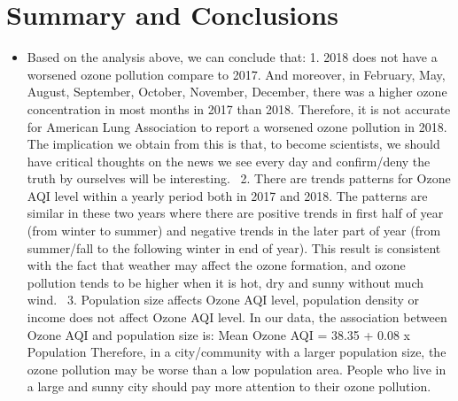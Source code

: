 \documentclass[12pt,]{article}
\begin{document}
\newpage

\section{Summary and Conclusions}\label{summary-and-conclusions}

\begin{itemize}
\item[]Based on the analysis above, we can conclude that: 
1.  2018 does not have a worsened ozone pollution compare to 2017. And moreover, in February, May, August, September, October, November, December, there was a higher ozone concentration in most months in 2017 than 2018. Therefore, it is not accurate for American Lung Association to report a worsened ozone pollution in 2018. The implication we obtain from this is that, to become scientists, we should have critical thoughts on the news we see every day and confirm/deny the truth by ourselves will be interesting.  \
2.  There are trends patterns for Ozone AQI level within a yearly period both in 2017 and 2018. The patterns are similar in these two years where there are positive trends in first half of year (from winter to summer) and negative trends in the later part of year (from summer/fall to the following winter in end of year). This result is consistent with the fact that weather may affect the ozone formation, and ozone pollution tends to be higher when it is hot, dry and sunny without much wind.  \
3.  Population size affects Ozone AQI level, population density or income does not affect Ozone AQI level. In our data, the association between Ozone AQI and population size is:   
Mean Ozone AQI = 38.35 + 0.08 x Population  
Therefore, in a city/community with a larger population size, the ozone pollution may be worse than a low population area. People who live in a large and sunny city should pay more attention to their ozone pollution.
\end{itemize}
\end{document}
